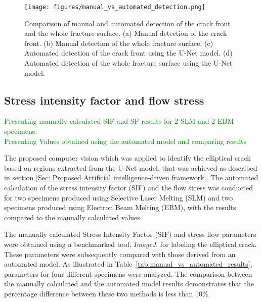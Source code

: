 \documentclass[preprint,12pt]{elsarticle}
\begin{document}
\begin{figure}[ht!]
\centering
\texttt{[image: figures/manual\_vs\_automated\_detection.png]}
\caption{Comparison of manual and automated detection of the crack front and the whole fracture surface. (a) Manual detection of the crack front. (b) Manual detection of the whole fracture surface. (c) Automated detection of the crack front using the U-Net model. (d) Automated detection of the whole fracture surface using the U-Net model.}
\label{fig:manual_vs_automated_detection}
\end{figure}

\subsection{Stress intensity factor and flow stress}
\label{Subsec: Stress intensity factor and flow stress}
\textcolor{green}{Presenting manually calculated SIF and SF results for 2 SLM and 2 EBM specimens.\\Presenting Values obtained using the automated model and comparing results }

The proposed computer vision which was applied to identify the elliptical crack based on regions extracted from the U-Net model, that was achieved as described in section \ref{Sec: Proposed Artificial intelligence-driven framework}.
The automated calculation of the stress intensity factor (SIF) and the flow stress was conducted for two specimens produced using Selective Laser Melting (SLM) and two specimens produced using Electron Beam Melting (EBM),
with the results compared to the manually calculated values.

The manually calculated Stress Intensity Factor (SIF) and stress flow parameters were obtained using a benchmarked tool, \textit{ImageJ}, for labeling the elliptical crack.
These parameters were subsequently compared with those derived from an automated model.
As illustrated in Table~\ref{tab:manual_vs_automated_results}, parameters for four different specimens were analyzed.
The comparison between the manually calculated and the automated model results demonstrates that the percentage difference between these two methods is less than 10\%.
\end{document}
